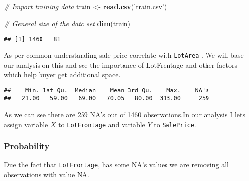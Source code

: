 \documentclass[]{article}
\newenvironment{Shaded}{\begin{snugshade}}{\end{snugshade}}
\newcommand{\CommentTok}[1]{\textcolor[rgb]{0.56,0.35,0.01}{\textit{#1}}}
\newcommand{\KeywordTok}[1]{\textcolor[rgb]{0.13,0.29,0.53}{\textbf{#1}}}
\newcommand{\NormalTok}[1]{#1}
\newcommand{\OperatorTok}[1]{\textcolor[rgb]{0.81,0.36,0.00}{\textbf{#1}}}
\newcommand{\StringTok}[1]{\textcolor[rgb]{0.31,0.60,0.02}{#1}}
\begin{document}
\begin{Shaded}
\begin{Highlighting}[]
\CommentTok{# Import training data}
\NormalTok{train <-}\StringTok{ }\KeywordTok{read.csv}\NormalTok{(}\StringTok{'train.csv'}\NormalTok{)}

\CommentTok{# General size of the data set}
\KeywordTok{dim}\NormalTok{(train)}
\end{Highlighting}
\end{Shaded}

\begin{verbatim}
## [1] 1460   81
\end{verbatim}

As per common understanding sale price correlate with \texttt{LotArea} .
We will base our analysis on this and see the importance of LotFrontage
and other factors which help buyer get additional space.

\begin{Shaded}
\end{Shaded}

\begin{verbatim}
##    Min. 1st Qu.  Median    Mean 3rd Qu.    Max.    NA's 
##   21.00   59.00   69.00   70.05   80.00  313.00     259
\end{verbatim}

As we can see there are 259 NA's out of 1460 observations.In our
analysis I lets assign variable \(X\) to \texttt{LotFrontage} and
variable \(Y\) to \texttt{SalePrice}.

\begin{Shaded}
\end{Shaded}

\hypertarget{probability}{%
\subsubsection{Probability}\label{probability}}

Due the fact that \texttt{LotFrontage}, has some NA's values we are
removing all observations with value NA.
\end{document}
